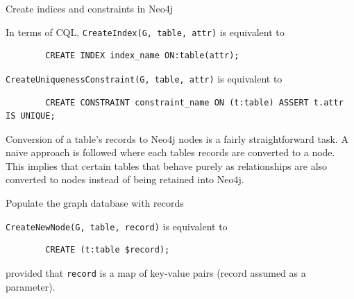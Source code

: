 \documentclass[12pt]{article}
\begin{document}
    \begin{algorithm}[htb!]
        \SetAlgoLined
        \caption{Create indices and constraints in Neo4j}
        \label{algo:sql_create_index}
    \end{algorithm}

    \FloatBarrier

    In terms of CQL, \verb|CreateIndex(G, table, attr)| is equivalent to 
    \begin{lstlisting}
        CREATE INDEX index_name ON:table(attr);
    \end{lstlisting}
    \verb|CreateUniquenessConstraint(G, table, attr)| is equivalent to 
    \begin{lstlisting}
        CREATE CONSTRAINT constraint_name ON (t:table) ASSERT t.attr IS UNIQUE;
    \end{lstlisting}

    Conversion of a table's records to Neo4j nodes is a fairly straightforward task. A naive approach is followed where each tables records are converted to a node. This implies that certain tables that behave purely as relationships are also converted to nodes instead of being retained into Neo4j.

    \begin{algorithm}[htb!]
        \SetAlgoLined
        \caption{Populate the graph database with records}
        \label{algo:sql2graph}
    \end{algorithm}

    \verb|CreateNewNode(G, table, record)| is equivalent to 
    \begin{lstlisting}
        CREATE (t:table $record);
    \end{lstlisting}
    provided that \verb|record| is a map of key-value pairs (record assumed as a parameter).
\end{document}
